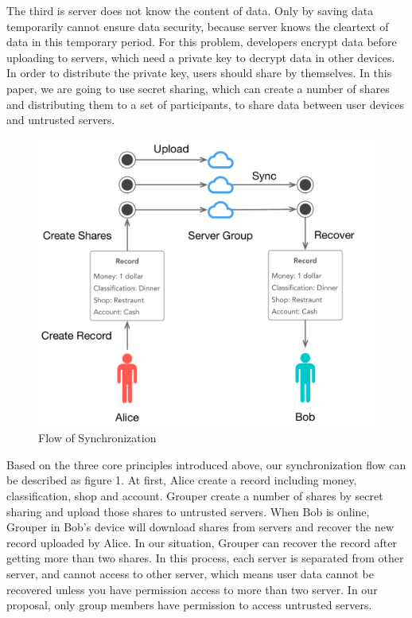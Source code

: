 \documentclass[twocolumn,10pt]{article}
\begin{document}
The third is server does not know the content of data. Only by saving data temporarily cannot ensure data security, because server knows the cleartext of data in this temporary period. For this problem, developers encrypt data before uploading to servers, which need a private key to decrypt data in other devices. In order to distribute the private key, users should share by themselves. In this paper, we are going to use secret sharing, which can create a number of shares and distributing them to a set of participants\cite{smith2013layered}, to share data between user devices and untrusted servers.

\begin{figure}[t]
\centering
\includegraphics[scale=0.4]{sync_flow}
\caption{Flow of Synchronization}
\end{figure}
Based on the three core principles introduced above, our synchronization flow can be described as figure 1. At first, Alice create a record including money, classification, shop and account. Grouper create a number of shares by secret sharing and upload those shares to untrusted servers. When Bob is online, Grouper in Bob's device will download shares from servers and recover the new record uploaded by Alice. In our situation, Grouper can recover the record after getting more than two shares. In this process, each server is separated from other server, and cannot access to other server, which means user data cannot be recovered unless you have permission access to more than two server. In our proposal, only group members have permission to access untrusted servers.
\end{document}
